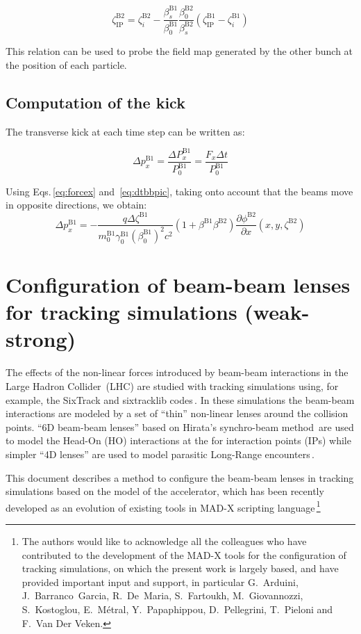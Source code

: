 \begin{equation}
\zeta^\text{B2}_\text{IP}
=
\zeta^\text{B2}_i
-\frac{\beta^\text{B1}_s}{\beta_0^\text{B1}}
\frac{\beta_0^\text{B2}}{\beta^\text{B2}_s}
\left(\zeta^\text{B1}_\text{IP} -  \zeta^\text{B1}_i \right)
\end{equation}

This relation can be used to probe the field map generated by the other bunch at the position of each particle.

\subsection{Computation of the kick}

The transverse kick at each time step can be written as:

\begin{equation}
\Delta p^\text{B1}_x = \frac{\Delta P^\text{B1}_x}{P^\text{B1}_0} = \frac{F_x \Delta t}{P^\text{B1}_0}
\end{equation}

Using Eqs.\,\ref{eq:forcex} and~\ref{eq:dtbbpic}, taking onto account that the beams move in opposite directions, we obtain:
\begin{equation}
\Delta p^\text{B1}_x = 
-\frac{q\Delta \zeta^\text{B1}}
{m_0^\text{B1}\gamma^\text{B1}_0(\beta^\text{B1}_0)^2 c^2}
\left(1+\beta^\text{B1}  \beta^\text{B2}\right) 
\frac{\partial \phi^\text{B2}}{\partial x}(x, y, \zeta^\text{B2})
\end{equation}

\section{Configuration of beam-beam lenses for tracking simulations (weak-strong)}

The effects of the non-linear forces introduced by beam-beam interactions in the Large Hadron Collider~(LHC) are studied with tracking simulations using, for example, the SixTrack and sixtracklib codes\,\cite{sixtracksite, sixtracklibrepo}. In these simulations the beam-beam interactions are modeled by a set of ``thin'' non-linear lenses around the collision points.
 ``6D beam-beam lenses'' based on Hirata's synchro-beam method\,\cite{hirata, bb6dnote, bb6dslides} are used to model the Head-On (HO) interactions at the for interaction points (IPs) while simpler ``4D lenses'' are used to model parasitic Long-Range encounters\,\cite{casbeambeam}.
 
This document describes a method to configure the beam-beam lenses in tracking simulations based on the model of the accelerator, which has been recently developed as an evolution of existing tools in MAD-X scripting language\,\cite{bbmacrorepo}\footnote{
The authors would like to acknowledge all the colleagues who  have contributed to the development of the MAD-X tools for the configuration of tracking simulations, on which the present work is largely based, and have provided important input and support, in particular G.~Arduini, J.~Barranco~Garcia, R.~De~Maria, S.~Fartoukh, M.~Giovannozzi, S.~Kostoglou, E.~M\'etral,  Y.~Papaphippou, D.~Pellegrini, T.~Pieloni and F.~Van Der Veken.}

